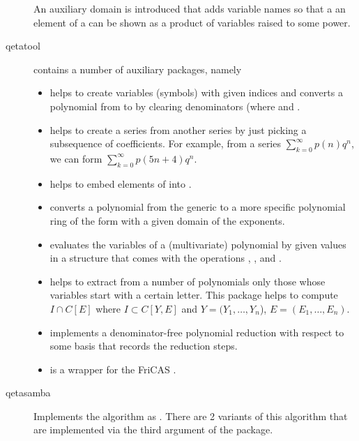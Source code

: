 \documentclass{article}
\begin{document}
\begin{description}
  An auxiliary domain is introduced that adds variable names so that a
  an element of a  can be shown as a product
  of variables raised to some power.

\item[qetatool] contains a number of auxiliary packages, namely
  \begin{itemize}
  \item {} helps to create variables (symbols) with
    given indices and converts a polynomial from
     to 
    by clearing denominators (where  and
    .
  \item {} helps to create a series from another
    series by just picking a subsequence of coefficients. For example,
    from a series $\sum_{k=0}^\infty p(n)q^n$, we can form
    $\sum_{k=0}^\infty p(5n+4)q^n$.
  \item {} helps to embed elements of
     into .
  \item {} converts a polynomial from the
    generic  to a more specific polynomial ring of
    the form  with a given domain of the
    exponents.
  \item {} evaluates the variables of a
    (multivariate) polynomial by given values in a structure that
    comes with the operations \code{+}, \code{*}, and \code{^}.
  \item {} helps to extract from a number of
    polynomials only those whose variables start with a certain
    letter.
    This package helps to compute $I\cap C[E]$ where
    $I \subset C[Y,E]$ and $Y=(Y_1,\ldots,Y_n$),
    $E=(E_1,\ldots, E_n)$.
  \item {} implements a
    denominator-free polynomial reduction with respect to some basis
    that records the reduction steps.
  \item {} is a wrapper for the FriCAS
    .
  \end{itemize}

\item[qetasamba] Implements the \algoSamba{} algorithm as
  .
  There are 2 variants of this algorithm that are implemented via the
  third argument of the  package.


\end{description}
\end{document}
